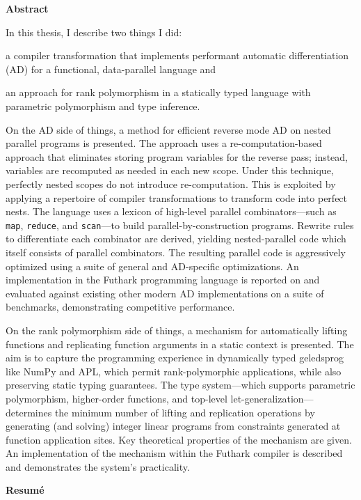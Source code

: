 \begin{center}
  \textbf{Abstract}
\end{center}
In this thesis, I describe two things I did:
\begin{enumerate*}[label=\arabic*)]
\item a compiler transformation that
implements performant automatic differentiation (AD) for a functional,
data-parallel language and
\item an approach for rank polymorphism in a statically typed language with
  parametric polymorphism and type inference.
\end{enumerate*}

On the AD side of things, a method for efficient reverse mode AD on nested
parallel programs is presented. The approach uses a re-computation-based approach
that eliminates storing program variables for the reverse pass; instead,
variables are recomputed as needed in each new scope. Under this technique,
perfectly nested scopes do not introduce re-computation. This is exploited by
applying a repertoire of compiler transformations to transform code into perfect
nests.
%
The language uses a lexicon of high-level parallel combinators---such as
\texttt{map}, \texttt{reduce}, and \texttt{scan}---to build
parallel-by-construction programs. Rewrite rules to differentiate each
combinator are derived, yielding nested-parallel code which itself consists of
parallel combinators. The resulting parallel code is aggressively optimized
using a suite of general and AD-specific optimizations.
%
An implementation in the Futhark programming language is reported on and
evaluated against existing other modern AD implementations on a suite of
benchmarks, demonstrating competitive performance.

On the rank polymorphism side of things, a mechanism for automatically lifting
functions and replicating function arguments in a static context is
presented. The aim is to capture the programming experience in dynamically typed
geledsprog like NumPy and APL, which permit rank-polymorphic applications,
while also preserving static typing guarantees. The type system---which supports
parametric polymorphism, higher-order functions, and top-level
let-generalization---determines the minimum number of lifting and replication
operations by generating (and solving) integer linear programs from constraints
generated at function application sites. Key theoretical properties of the
mechanism are given. An implementation of the mechanism within the Futhark
compiler is described and demonstrates the system's practicality.
  \newpage
\begin{center}
  \textbf{Resum\'e}
\end{center}
